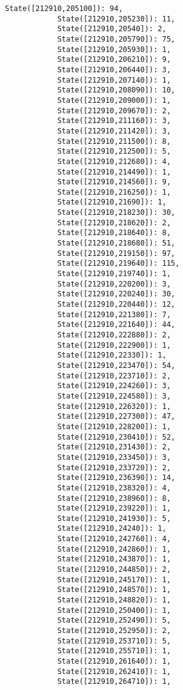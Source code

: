 \documentclass[11pt]{article}
\begin{document}
\begin{Verbatim}[commandchars=\\\{\}]
            State([212910,205100]): 94,
            State([212910,205230]): 11,
            State([212910,20540]): 2,
            State([212910,205790]): 75,
            State([212910,205930]): 1,
            State([212910,206210]): 9,
            State([212910,206440]): 3,
            State([212910,207140]): 1,
            State([212910,208090]): 10,
            State([212910,209000]): 1,
            State([212910,209670]): 2,
            State([212910,211160]): 3,
            State([212910,211420]): 3,
            State([212910,211500]): 8,
            State([212910,212500]): 5,
            State([212910,212680]): 4,
            State([212910,214490]): 1,
            State([212910,214560]): 9,
            State([212910,216250]): 1,
            State([212910,21690]): 1,
            State([212910,218230]): 30,
            State([212910,218620]): 2,
            State([212910,218640]): 8,
            State([212910,218680]): 51,
            State([212910,219150]): 97,
            State([212910,219640]): 115,
            State([212910,219740]): 1,
            State([212910,220200]): 3,
            State([212910,220240]): 30,
            State([212910,220440]): 12,
            State([212910,221380]): 7,
            State([212910,221640]): 44,
            State([212910,222880]): 2,
            State([212910,222900]): 1,
            State([212910,22330]): 1,
            State([212910,223470]): 54,
            State([212910,223710]): 2,
            State([212910,224260]): 3,
            State([212910,224580]): 3,
            State([212910,226320]): 1,
            State([212910,227300]): 47,
            State([212910,228200]): 1,
            State([212910,230410]): 52,
            State([212910,231430]): 2,
            State([212910,233450]): 3,
            State([212910,233720]): 2,
            State([212910,236390]): 14,
            State([212910,238320]): 4,
            State([212910,238960]): 8,
            State([212910,239220]): 1,
            State([212910,241930]): 5,
            State([212910,24240]): 1,
            State([212910,242760]): 4,
            State([212910,242860]): 1,
            State([212910,243870]): 1,
            State([212910,244850]): 2,
            State([212910,245170]): 1,
            State([212910,248570]): 1,
            State([212910,248820]): 1,
            State([212910,250400]): 1,
            State([212910,252490]): 5,
            State([212910,252950]): 2,
            State([212910,253710]): 5,
            State([212910,255710]): 1,
            State([212910,261640]): 1,
            State([212910,262410]): 1,
            State([212910,264710]): 1,

\end{Verbatim}
\end{document}
